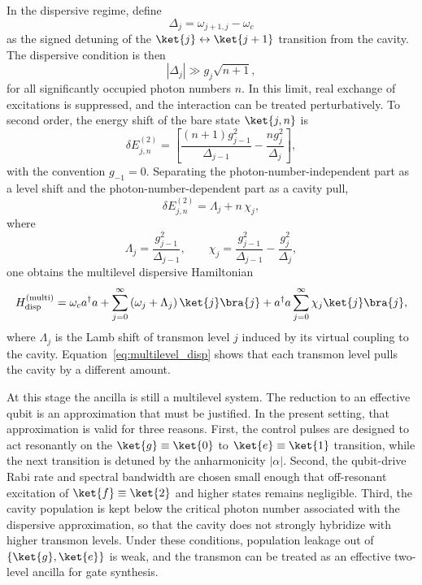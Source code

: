 In the dispersive regime, define
\begin{equation}
    \Delta_j = \omega_{j+1,j}-\omega_c
\end{equation}
as the signed detuning of the \(\ket{j}\leftrightarrow\ket{j+1}\) transition from the cavity. The dispersive condition is then
\begin{equation}
    |\Delta_j| \gg g_j\sqrt{n+1},
\end{equation}
for all significantly occupied photon numbers \(n\). In this limit, real exchange of excitations is suppressed, and the interaction can be treated perturbatively. To second order, the energy shift of the bare state \(\ket{j,n}\) is
\begin{equation}
    \delta E_{j,n}^{(2)}
    =
    \left[
        \frac{(n+1)g_{j-1}^2}{\Delta_{j-1}}
        -
        \frac{n g_j^2}{\Delta_j}
    \right],
\end{equation}
with the convention \(g_{-1}=0\). Separating the photon-number-independent part as a level shift and the photon-number-dependent part as a cavity pull,
\begin{equation}
    \delta E_{j,n}^{(2)} = \Lambda_j + n\,\chi_j,
\end{equation}
where
\begin{equation}
    \Lambda_j = \frac{g_{j-1}^2}{\Delta_{j-1}},
    \qquad
    \chi_j
    =
    \frac{g_{j-1}^2}{\Delta_{j-1}}
    -
    \frac{g_j^2}{\Delta_j},
\end{equation}
one obtains the multilevel dispersive Hamiltonian
\begin{equation}
    H_{\mathrm{disp}}^{(\mathrm{multi})}
    =
    \omega_c a^\dagger a
    +
    \sum_{j=0}^\infty
    \left(\omega_j+\Lambda_j\right)\ket{j}\bra{j}
    +
    a^\dagger a
    \sum_{j=0}^\infty
    \chi_j \ket{j}\bra{j},
    \label{eq:multilevel_disp}
\end{equation}
where \(\Lambda_j\) is the Lamb shift of transmon level \(j\) induced by its virtual coupling to the cavity. Equation~\eqref{eq:multilevel_disp} shows that each transmon level pulls the cavity by a different amount.

At this stage the ancilla is still a multilevel system. The reduction to an effective qubit is an approximation that must be justified. In the present setting, that approximation is valid for three reasons. First, the control pulses are designed to act resonantly on the \(\ket{g}\equiv\ket{0}\) to \(\ket{e}\equiv\ket{1}\) transition, while the next transition is detuned by the anharmonicity \(|\alpha|\). Second, the qubit-drive Rabi rate and spectral bandwidth are chosen small enough that off-resonant excitation of \(\ket{f}\equiv\ket{2}\) and higher states remains negligible. Third, the cavity population is kept below the critical photon number associated with the dispersive approximation, so that the cavity does not strongly hybridize with higher transmon levels. Under these conditions, population leakage out of \(\{\ket{g},\ket{e}\}\) is weak, and the transmon can be treated as an effective two-level ancilla for gate synthesis.

